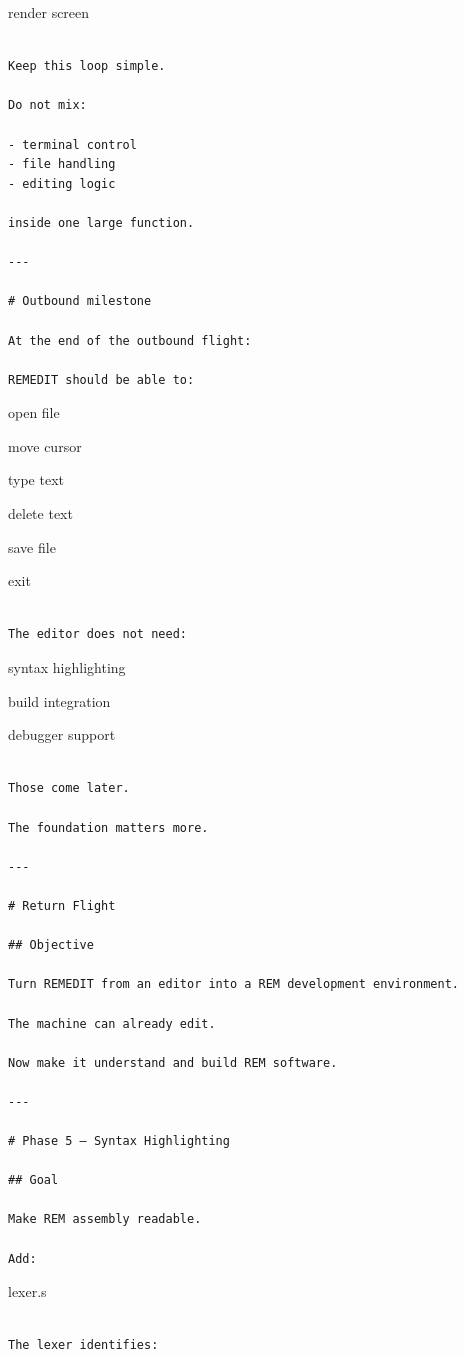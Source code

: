 \documentclass[
  oneside,
  openany]{book}
\begin{document}
render screen

\begin{verbatim}

Keep this loop simple.

Do not mix:

- terminal control
- file handling
- editing logic

inside one large function.

---

# Outbound milestone

At the end of the outbound flight:

REMEDIT should be able to:
\end{verbatim}

open file

move cursor

type text

delete text

save file

exit

\begin{verbatim}

The editor does not need:
\end{verbatim}

syntax highlighting

build integration

debugger support

\begin{verbatim}

Those come later.

The foundation matters more.

---

# Return Flight

## Objective

Turn REMEDIT from an editor into a REM development environment.

The machine can already edit.

Now make it understand and build REM software.

---

# Phase 5 — Syntax Highlighting

## Goal

Make REM assembly readable.

Add:
\end{verbatim}

lexer.s

\begin{verbatim}

The lexer identifies:
\end{verbatim}
\end{document}
